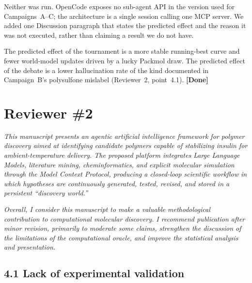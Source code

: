 \documentclass[11pt]{article}
\newcommand{\done}{\textcolor{green!60!black}{\textbf{[Done]}}}
\begin{document}
Neither was run.
OpenCode exposes no sub-agent API in the version used for Campaigns~A--C; the architecture is a single session calling one MCP server.
We added one Discussion paragraph that states the predicted effect and the reason it was not executed, rather than claiming a result we do not have.

The predicted effect of the tournament is a more stable running-best curve and fewer world-model updates driven by a lucky Packmol draw.
The predicted effect of the debate is a lower hallucination rate of the kind documented in Campaign~B's polysulfone mislabel (Reviewer~2, point~4.1). \done

\bigskip

\section*{Reviewer \#2}

\noindent\textit{This manuscript presents an agentic artificial intelligence framework for polymer discovery aimed at identifying candidate polymers capable of stabilizing insulin for ambient-temperature delivery.
The proposed platform integrates Large Language Models, literature mining, cheminformatics, and explicit molecular simulation through the Model Context Protocol, producing a closed-loop scientific workflow in which hypotheses are continuously generated, tested, revised, and stored in a persistent ``discovery world.''}

\medskip
\noindent\textit{Overall, I consider this manuscript to make a valuable methodological contribution to computational molecular discovery.
I recommend publication after minor revision, primarily to moderate some claims, strengthen the discussion of the limitations of the computational oracle, and improve the statistical analysis and presentation.}

\subsection*{4.1 Lack of experimental validation}
\end{document}
